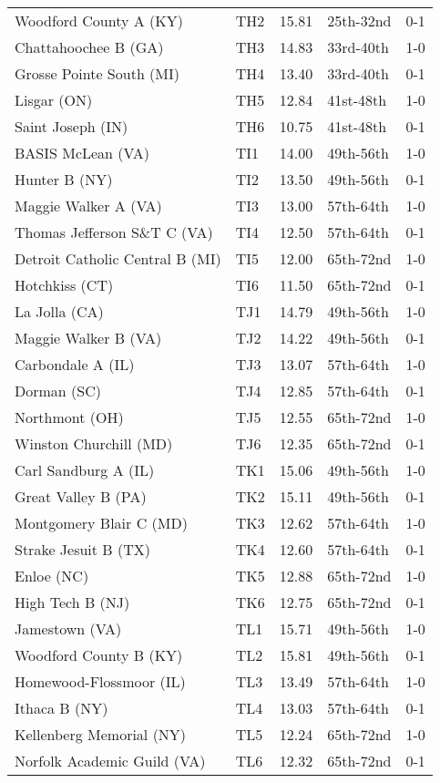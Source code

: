 \documentclass{article}%
\begin{document}
\begin{longtable}{|llllc|}
Woodford County A (KY)&TH2&15.81&25th{-}32nd&0{-}1\\%
Chattahoochee B (GA)&TH3&14.83&33rd{-}40th&1{-}0\\%
Grosse Pointe South (MI)&TH4&13.40&33rd{-}40th&0{-}1\\%
Lisgar (ON)&TH5&12.84&41st{-}48th&1{-}0\\%
Saint Joseph (IN)&TH6&10.75&41st{-}48th&0{-}1\\%
BASIS McLean (VA)&TI1&14.00&49th{-}56th&1{-}0\\%
Hunter B (NY)&TI2&13.50&49th{-}56th&0{-}1\\%
Maggie Walker A (VA)&TI3&13.00&57th{-}64th&1{-}0\\%
Thomas Jefferson S\&T C (VA)&TI4&12.50&57th{-}64th&0{-}1\\%
Detroit Catholic Central B (MI)&TI5&12.00&65th{-}72nd&1{-}0\\%
Hotchkiss (CT)&TI6&11.50&65th{-}72nd&0{-}1\\%
La Jolla (CA)&TJ1&14.79&49th{-}56th&1{-}0\\%
Maggie Walker B (VA)&TJ2&14.22&49th{-}56th&0{-}1\\%
Carbondale A (IL)&TJ3&13.07&57th{-}64th&1{-}0\\%
Dorman (SC)&TJ4&12.85&57th{-}64th&0{-}1\\%
Northmont (OH)&TJ5&12.55&65th{-}72nd&1{-}0\\%
Winston Churchill (MD)&TJ6&12.35&65th{-}72nd&0{-}1\\%
Carl Sandburg A (IL)&TK1&15.06&49th{-}56th&1{-}0\\%
Great Valley B (PA)&TK2&15.11&49th{-}56th&0{-}1\\%
Montgomery Blair C (MD)&TK3&12.62&57th{-}64th&1{-}0\\%
Strake Jesuit B (TX)&TK4&12.60&57th{-}64th&0{-}1\\%
Enloe (NC)&TK5&12.88&65th{-}72nd&1{-}0\\%
High Tech B (NJ)&TK6&12.75&65th{-}72nd&0{-}1\\%
Jamestown (VA)&TL1&15.71&49th{-}56th&1{-}0\\%
Woodford County B (KY)&TL2&15.81&49th{-}56th&0{-}1\\%
Homewood{-}Flossmoor (IL)&TL3&13.49&57th{-}64th&1{-}0\\%
Ithaca B (NY)&TL4&13.03&57th{-}64th&0{-}1\\%
Kellenberg Memorial (NY)&TL5&12.24&65th{-}72nd&1{-}0\\%
Norfolk Academic Guild (VA)&TL6&12.32&65th{-}72nd&0{-}1\\%
\end{longtable}%
\end{document}
